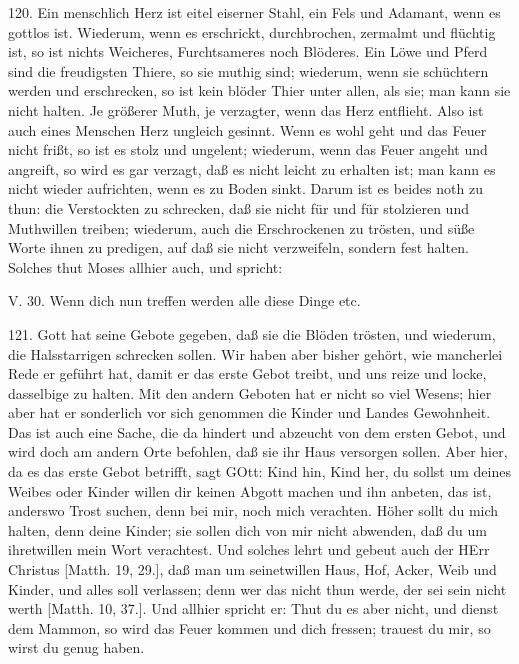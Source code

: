 120. Ein menschlich Herz ist eitel eiserner Stahl, ein Fels und Adamant, wenn es gottlos ist. Wiederum, wenn es erschrickt, durchbrochen, zermalmt und flüchtig ist, so ist nichts Weicheres, Furchtsameres noch Blöderes. Ein Löwe und Pferd sind die freudigsten Thiere, so sie muthig sind; wiederum, wenn sie schüchtern werden und erschrecken, so ist kein blöder Thier unter allen, als sie; man kann sie nicht halten. Je größerer Muth, je verzagter, wenn das Herz entflieht. Also ist auch eines Menschen Herz ungleich gesinnt. Wenn es wohl geht und das Feuer nicht frißt, so ist es stolz und ungelent; wiederum, wenn das Feuer angeht und angreift, so wird es gar verzagt, daß es nicht leicht zu erhalten ist; man kann es nicht wieder aufrichten, wenn es zu Boden sinkt. Darum ist es beides noth zu thun: die Verstockten zu schrecken, daß sie nicht für und für stolzieren und Muthwillen treiben; wiederum, auch die Erschrockenen zu trösten, und süße Worte ihnen zu predigen, auf daß sie nicht verzweifeln, sondern fest halten. Solches thut Moses allhier auch, und spricht:

\begin{schriftzitat}
V. 30. Wenn dich nun treffen werden alle diese Dinge etc.
\end{schriftzitat}

121. Gott hat seine Gebote gegeben, daß sie die Blöden trösten, und wiederum, die Halsstarrigen schrecken sollen. Wir haben aber bisher gehört, wie mancherlei Rede er geführt hat, damit er das erste Gebot treibt, und uns reize und locke, dasselbige zu halten. Mit den andern Geboten hat er nicht so viel Wesens; hier aber hat er sonderlich vor sich genommen die Kinder und Landes Gewohnheit. Das ist auch eine Sache, die da hindert und abzeucht von dem ersten Gebot, und wird doch am andern Orte befohlen, daß sie ihr Haus versorgen sollen. Aber hier, da es das erste Gebot betrifft, sagt GOtt: Kind hin, Kind her, du sollst um deines Weibes oder Kinder willen dir keinen Abgott machen und ihn anbeten, das ist, anderswo Trost suchen, denn bei mir, noch mich verachten. Höher sollt du mich halten, denn deine Kinder; sie sollen dich von mir nicht abwenden, daß du um ihretwillen mein Wort verachtest. Und solches lehrt und gebeut auch der HErr Christus [Matth. 19, 29.], daß man um seinetwillen Haus, Hof, Acker, Weib und Kinder, und alles soll verlassen; denn wer das nicht thun werde, der sei sein nicht werth [Matth. 10, 37.]. Und allhier spricht er: Thut du es aber nicht, und dienst dem Mammon, so wird das Feuer kommen und dich fressen; trauest du mir, so wirst du genug haben.

